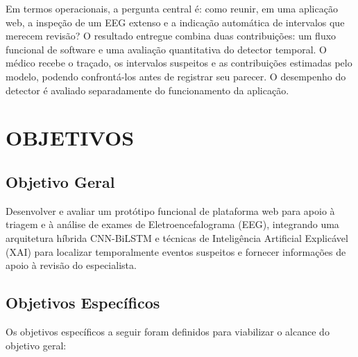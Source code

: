 Em termos operacionais, a pergunta central é: como reunir, em uma aplicação web, a inspeção de um EEG extenso e a indicação automática de intervalos que merecem revisão? O resultado entregue combina duas contribuições: um fluxo funcional de software e uma avaliação quantitativa do detector temporal. O médico recebe o traçado, os intervalos suspeitos e as contribuições estimadas pelo modelo, podendo confrontá-los antes de registrar seu parecer. O desempenho do detector é avaliado separadamente do funcionamento da aplicação.

\section{OBJETIVOS}
\subsection{Objetivo Geral}
Desenvolver e avaliar um protótipo funcional de plataforma web para apoio à triagem e à análise de exames de Eletroencefalograma (EEG), integrando uma arquitetura híbrida CNN-BiLSTM e técnicas de Inteligência Artificial Explicável (XAI) para localizar temporalmente eventos suspeitos e fornecer informações de apoio à revisão do especialista.

\subsection{Objetivos Específicos}
Os objetivos específicos a seguir foram definidos para viabilizar o alcance do objetivo geral:

